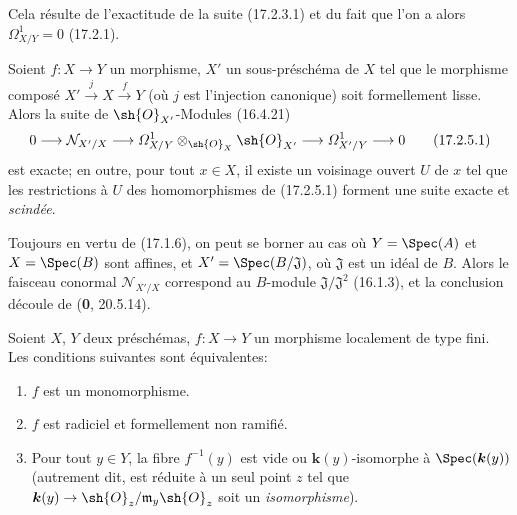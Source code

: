 Cela résulte de l'exactitude de la suite (17.2.3.1) et du fait que l'on a alors $\varOmega_{X/Y}^1=0$ (17.2.1).

\begin{proposition}[17.2.5]
\label{IV.17.2.5}
Soient $f:X\to Y$ un morphisme, $X'$ un sous-préschéma de $X$ tel que le morphisme composé $X'\xrightarrow{j}X\xrightarrow{f}Y$ (où $j$ est l'injection canonique) soit formellement lisse. Alors la suite de $\sh{O}_{X'}$-Modules \textup{(16.4.21)}
\[
\label{IV.17.2.5.1}
  0\longrightarrow\mathcal{N}_{X'/X}\longrightarrow\varOmega_{X/Y}^1\otimes_{\sh{O}_X}\sh{O}_{X'}\longrightarrow\varOmega_{X'/Y}^1\longrightarrow0
  \tag{17.2.5.1}
\]
est exacte; en outre, pour tout $x\in X$, il existe un voisinage ouvert $U$ de $x$ tel que les restrictions à $U$ des homomorphismes de \textup{(17.2.5.1)} forment une suite exacte et \emph{scindée}.
\end{proposition}

Toujours en vertu de (17.1.6), on peut se borner au cas où $Y=\Spec(A)$ et $X=\Spec(B)$ sont affines, et $X'=\Spec(B/\mathfrak{J})$, où $\mathfrak{J}$ est un idéal de $B$. Alors le faisceau conormal $\mathcal{N}_{X'/X}$ correspond au $B$-module $\mathfrak{J}/\mathfrak{J}^2$ (16.1.3), et la conclusion découle de (\textbf{0}, 20.5.14).

\begin{proposition}[17.2.6]
\label{IV.17.2.6}
Soient $X$, $Y$ deux préschémas, $f:X\to Y$ un morphisme localement de type fini. Les conditions suivantes sont équivalentes:
\begin{enumerate}
  \item[\textup{a)}] $f$ est un monomorphisme.
  \item[\textup{b)}] $f$ est radiciel et formellement non ramifié.
  \item[\textup{c)}] Pour tout $y\in Y$, la fibre $f^{-1}(y)$ est vide ou $\boldsymbol{k}(y)$-isomorphe à $\Spec(\boldsymbol{k}(y))$ \textup{(autrement dit, est réduite à un seul point $z$ tel que} $\boldsymbol{k}(y)\to\sh{O}_z/\mathfrak{m}_y\sh{O}_z$ \textup{soit un \emph{isomorphisme})}.
\end{enumerate}
\end{proposition}

